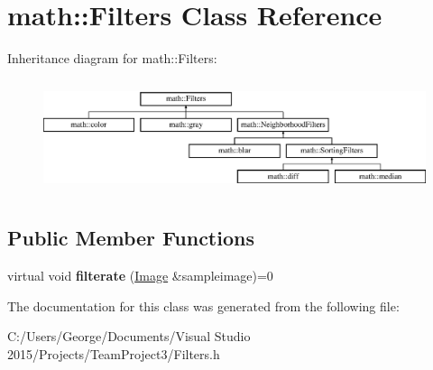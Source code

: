 \hypertarget{classmath_1_1_filters}{}\section{math\+:\+:Filters Class Reference}
\label{classmath_1_1_filters}
Inheritance diagram for math\+:\+:Filters\+:\begin{figure}[H]
\begin{center}
\leavevmode
\includegraphics[height=3.353293cm]{classmath_1_1_filters}
\end{center}
\end{figure}
\subsection*{Public Member Functions}
\begin{DoxyCompactItemize}
\item 
\mbox{\label{classmath_1_1_filters_a3c0f9f6960ec0849f74e1e91d27a93c0}} 
virtual void {\bfseries filterate} (\hyperlink{classmath_1_1_image}{Image} \&sampleimage)=0
\end{DoxyCompactItemize}


The documentation for this class was generated from the following file\+:\begin{DoxyCompactItemize}
\item 
C\+:/\+Users/\+George/\+Documents/\+Visual Studio 2015/\+Projects/\+Team\+Project3/Filters.\+h\end{DoxyCompactItemize}
